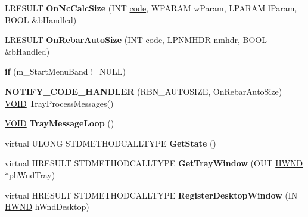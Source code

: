 \begin{DoxyCompactItemize}
\item 
\mbox{\label{class_c_tray_window_a4b88a03d64c5cf4aa6a041fb88e736ed}} 
L\+R\+E\+S\+U\+LT {\bfseries On\+Nc\+Calc\+Size} (I\+NT \hyperlink{structcode}{code}, W\+P\+A\+R\+AM w\+Param, L\+P\+A\+R\+AM l\+Param, B\+O\+OL \&b\+Handled)
\item 
\mbox{\label{class_c_tray_window_afc2680cabfbe27294dd03a0d22cc3bb7}} 
L\+R\+E\+S\+U\+LT {\bfseries On\+Rebar\+Auto\+Size} (I\+NT \hyperlink{structcode}{code}, \hyperlink{structtag_n_m_h_d_r}{L\+P\+N\+M\+H\+DR} nmhdr, B\+O\+OL \&b\+Handled)
\item 
\mbox{\label{class_c_tray_window_a224e0d1233ad08db7e9e4271696c2bba}} 
{\bfseries if} (m\+\_\+\+Start\+Menu\+Band !=N\+U\+LL)
\item 
\mbox{\label{class_c_tray_window_ad93325415b682e142d7527b768b1bb30}} 
{\bfseries N\+O\+T\+I\+F\+Y\+\_\+\+C\+O\+D\+E\+\_\+\+H\+A\+N\+D\+L\+ER} (R\+B\+N\+\_\+\+A\+U\+T\+O\+S\+I\+ZE, On\+Rebar\+Auto\+Size) \hyperlink{interfacevoid}{V\+O\+ID} Tray\+Process\+Messages()
\item 
\mbox{\label{class_c_tray_window_ac8a19b7e5e51752f7be8792c77e270b3}} 
\hyperlink{interfacevoid}{V\+O\+ID} {\bfseries Tray\+Message\+Loop} ()
\item 
\mbox{\label{class_c_tray_window_ae886c8b0e27648add4c36fadb9789146}} 
virtual U\+L\+O\+NG S\+T\+D\+M\+E\+T\+H\+O\+D\+C\+A\+L\+L\+T\+Y\+PE {\bfseries Get\+State} ()
\item 
\mbox{\label{class_c_tray_window_ae32fef55bac7e991b7e8a3a12dce7162}} 
virtual H\+R\+E\+S\+U\+LT S\+T\+D\+M\+E\+T\+H\+O\+D\+C\+A\+L\+L\+T\+Y\+PE {\bfseries Get\+Tray\+Window} (O\+UT \hyperlink{interfacevoid}{H\+W\+ND} $\ast$ph\+Wnd\+Tray)
\item 
\mbox{\label{class_c_tray_window_a52e3e40ab082b74bdb73af313c1eb19b}} 
virtual H\+R\+E\+S\+U\+LT S\+T\+D\+M\+E\+T\+H\+O\+D\+C\+A\+L\+L\+T\+Y\+PE {\bfseries Register\+Desktop\+Window} (IN \hyperlink{interfacevoid}{H\+W\+ND} h\+Wnd\+Desktop)
\item 

\end{DoxyCompactItemize}
